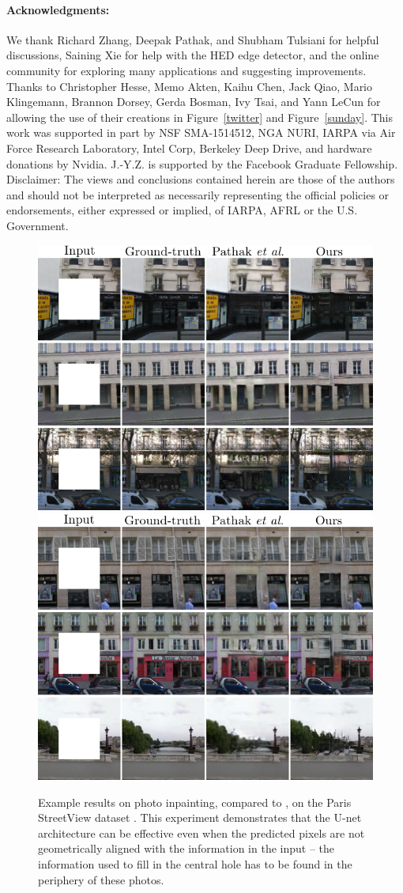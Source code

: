 \documentclass[10pt,twocolumn,letterpaper]{article}
\begin{document}
\vspace{-0.06in}


\paragraph{Acknowledgments:} We thank Richard Zhang, Deepak Pathak, and Shubham Tulsiani for helpful discussions, Saining Xie for help with the HED edge detector, and the online community for exploring many applications and suggesting improvements. Thanks to Christopher Hesse, Memo Akten, Kaihu Chen, Jack Qiao, Mario Klingemann, Brannon Dorsey, Gerda Bosman, Ivy Tsai, and Yann LeCun for allowing the use of their creations in Figure~\ref{twitter} and Figure~\ref{sunday}. This work was supported in part by NSF SMA-1514512, NGA NURI, IARPA via Air Force Research Laboratory, Intel Corp, Berkeley Deep Drive, and hardware donations by Nvidia. J.-Y.Z. is supported by the Facebook Graduate Fellowship. Disclaimer: The views and conclusions contained herein are those of the authors and should not be interpreted as necessarily representing the official policies or endorsements, either expressed or implied, of IARPA, AFRL or the U.S. Government.












\begin{figure}
    \centering
    \includegraphics[width=0.49\hsize]{figs/inpaint1.png}
    \includegraphics[width=0.49\hsize]{figs/inpaint2.png}
    \caption{Example results on photo inpainting, compared to \cite{pathak2016context}, on the Paris StreetView dataset \cite{doersch2012makes}. This experiment demonstrates that the U-net architecture can be effective even when the predicted pixels are not geometrically aligned with the information in the input -- the information used to fill in the central hole has to be found in the periphery of these photos.}
    \label{inpaint}
\end{figure}
\end{document}
